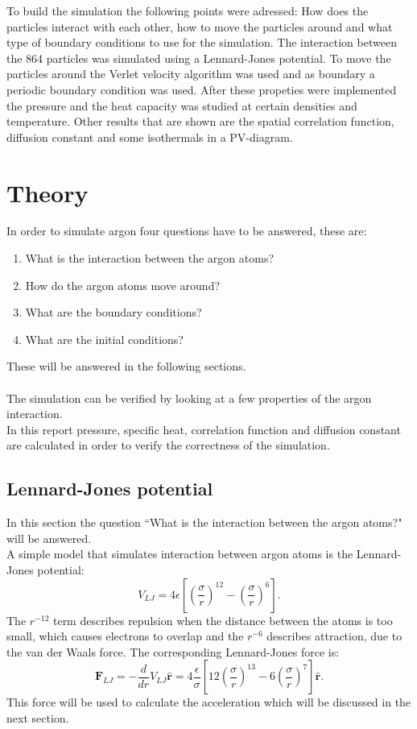 \documentclass[12pt,a4paper]{report}
\begin{document}
To build the simulation the following points were adressed: How does the particles interact with each other, how to move the particles around and what type of boundary conditions to use for the simulation. The interaction between the 864 particles was simulated using a Lennard-Jones potential. To move the particles around the Verlet velocity algorithm was used and as boundary a periodic boundary condition was used. After these propeties were implemented the pressure and the heat capacity was studied at certain densities and temperature. Other results that are shown are the spatial correlation function, diffusion constant and some isothermals in a PV-diagram.

\chapter{Theory}

In order to simulate argon four questions have to be answered, these are:
\begin{enumerate}
 \item What is the interaction between the argon atoms?
 \item How do the argon atoms move around?
 \item What are the boundary conditions?
 \item What are the initial conditions?
\end{enumerate}
These will be answered in the following sections.\\ \\
The simulation can be verified by looking at a few properties of the argon interaction.\\ In this report pressure, specific heat, correlation function and diffusion constant are calculated in order to verify the correctness of the simulation.

\section{Lennard-Jones potential}

In this section the question ``What is the interaction between the argon atoms?" will be answered.\\
A simple model that simulates interaction between argon atoms is the Lennard-Jones potential:
\begin{equation}\label{eq:lennardjones}
V_{LJ}=4\epsilon \left[ \left( \frac{\sigma}{r} \right)^{12} - \left( \frac{\sigma}{r} \right)^{6} \right]\text{.}
\end{equation}
The $r^{-12}$ term describes repulsion when the distance between the atoms is too small, which causes electrons to overlap and the $r^{-6}$ describes attraction, due to the van der Waals force. The corresponding Lennard-Jones force is:
\begin{equation}\label{eq:lennardjonesforce}
\boldsymbol{F}_{LJ}=-\frac{d}{dr}V_{LJ}\hat{\boldsymbol{r}}=4\frac{\epsilon}{\sigma} \left[ 12\left( \frac{\sigma}{r} \right)^{13} - 6\left( \frac{\sigma}{r} \right)^{7} \right]\hat{\boldsymbol{r}}\text{.}
\end{equation}
This force will be used to calculate the acceleration which will be discussed in the next section.
\end{document}

